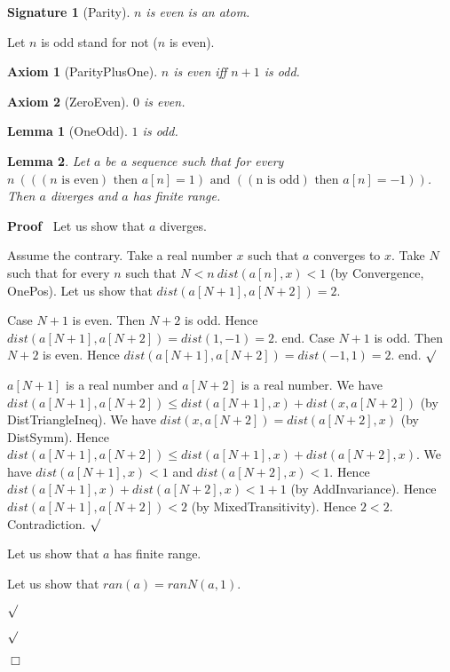\documentclass{article}
\newenvironment{forthel}{\begin{leftbar}}{\end{leftbar}}
\newenvironment{proof}{\noindent\textbf{Proof\ }}{\hspace*{\fill}$\Box$\medskip}
\newenvironment{subproof}{\begin{list}{}{}
		\item[\text{Proof}]}{\hfill $\surd$ \end{list}}
\newtheorem{axiom}{Axiom}
\newtheorem{lemma}{Lemma}
\newtheorem{signature}{Signature}
\begin{document}
\begin{forthel}
	\begin{signature} [Parity]
	$n$ is even is an atom.
	\end{signature}
	
	\noindent Let $n$ is odd stand for not ($n$ is even).
	
	\begin{axiom} [ParityPlusOne]
	$n$ is even iff $n + 1$ is odd.
	\end{axiom}

	\begin{axiom} [ZeroEven]
	$0$ is even.
	\end{axiom}
	
	\begin{lemma} [OneOdd]
	$1$ is odd.
	\end{lemma} 
	
	\begin{lemma}
	Let $a$ be a sequence such that for every $n \ (((n \text{ is even}) \text{ then } a[n] = 1) \text{ and } ((\text{n is odd}) \text{ then } a[n] = -1))$.
	Then $a$ diverges and $a$ has finite range.
	\end{lemma}
	\begin{proof}
	Let us show that $a$ diverges.
	\begin{subproof}
	Assume the contrary.
	Take a real number $x$ such that $a$ converges to $x$.
	Take $N$ such that for every $n$ such that $N < n \ dist(a[n],x) < 1$ (by Convergence, OnePos).
	Let us show that $dist(a[N + 1],a[N + 2]) = 2$.
	\begin{subproof}
	Case $N + 1$ is even.
	Then $N + 2$ is odd.
	Hence $dist(a[N + 1],a[N + 2]) = dist(1,-1) = 2$.
	end.
	Case $N + 1$ is odd.
	Then $N + 2$ is even.
	Hence $dist(a[N + 1],a[N + 2]) = dist(-1,1) = 2$.
	end.
	\end{subproof}
	$a[N + 1]$ is a real number and $a[N + 2]$ is a real number.
	We have $dist(a[N + 1],a[N + 2]) \leq dist(a[N + 1],x) + dist(x,a[N + 2])$ (by DistTriangleIneq).
	We have $dist(x,a[N + 2]) = dist(a[N + 2],x)$ (by DistSymm).
	Hence $dist(a[N + 1],a[N + 2]) \leq dist(a[N + 1],x) + dist(a[N + 2],x)$.
	We have $dist(a[N + 1],x) < 1$ and $dist(a[N + 2],x) < 1$.
	Hence $dist(a[N + 1],x) + dist(a[N + 2],x) < 1 + 1$ (by AddInvariance).
	Hence $dist(a[N + 1],a[N + 2]) < 2$ (by MixedTransitivity).
	Hence $2 < 2$.
	Contradiction.
	\end{subproof}
	Let us show that $a$ has finite range.
	\begin{subproof}
	Let us show that $ran(a) = ranN(a,1)$.
	\begin{subproof}

\end{subproof}
\end{subproof}
\end{proof}
\end{forthel}
\end{document}
